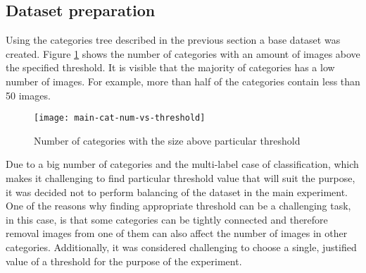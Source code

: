     
    
    
    
    
    
    
    
    
    \subsection{Dataset preparation}
    \label{sec:main-dataset-prep}
    Using the categories tree described in the previous section a base dataset was created. Figure \ref{fig:main-cat-num-vs-threshold} shows the number of categories with an amount of images above the specified threshold. It is visible that the majority of categories has a low number of images. For example, more than half of the categories contain less than 50 images.
    
    \begin{figure}[h!]
        \centering
        \texttt{[image: main-cat-num-vs-threshold]}
        \caption[Main experiment. Number of categories with the size above particular threshold]{Number of categories with the size above particular threshold}
        \label{fig:main-cat-num-vs-threshold}
    \end{figure}
    
    Due to a big number of categories and the multi-label case of classification, which makes it challenging to find particular threshold value that will suit the purpose, it was decided not to perform balancing of the dataset in the main experiment. One of the reasons why finding appropriate threshold can be a challenging task, in this case, is that some categories can be tightly connected and therefore removal images from one of them can also affect the number of images in other categories. Additionally, it was considered challenging to choose a single, justified value of a threshold for the purpose of the experiment.
    
